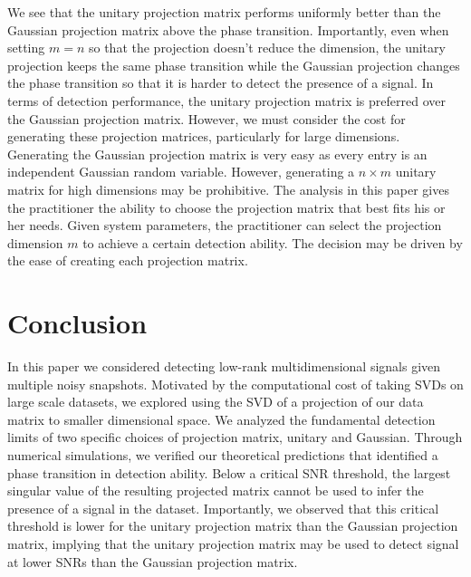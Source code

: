 We see that the unitary projection matrix performs uniformly better than the Gaussian
projection matrix above the phase transition. Importantly, even when setting $m=n$ so that
the projection doesn't reduce the dimension, the unitary projection keeps the same phase
transition while the Gaussian projection changes the phase transition so that it is harder
to detect the presence of a signal. In terms of detection performance, the unitary
projection matrix is preferred over the Gaussian projection matrix. However, we must
consider the cost for generating these projection matrices, particularly for large
dimensions. Generating the Gaussian projection matrix is very easy as every entry is an
independent Gaussian random variable. However, generating a $n\times m$ unitary matrix for
high dimensions may be prohibitive. The analysis in this paper gives the practitioner the
ability to choose the projection matrix that best fits his or her needs. Given system
parameters, the practitioner can select the projection dimension $m$ to achieve a certain
detection ability. The decision may be driven by the ease of creating each projection
matrix.

\section{Conclusion}\label{sec:chpt7:concl}

In this paper we considered detecting low-rank multidimensional signals given multiple
noisy snapshots. Motivated by the computational cost of taking SVDs on large scale
datasets, we explored using the SVD of a projection of our data matrix to smaller
dimensional space. We analyzed the fundamental detection limits of two specific choices of
projection matrix, unitary and Gaussian. Through numerical simulations, we verified our
theoretical predictions that identified a phase transition in detection ability. Below a
critical SNR threshold, the largest singular value of the resulting projected matrix
cannot be used to infer the presence of a signal in the dataset. Importantly, we observed
that this critical threshold is lower for the unitary projection matrix than the Gaussian
projection matrix, implying that the unitary projection matrix may be used to detect
signal at lower SNRs than the Gaussian projection matrix.
